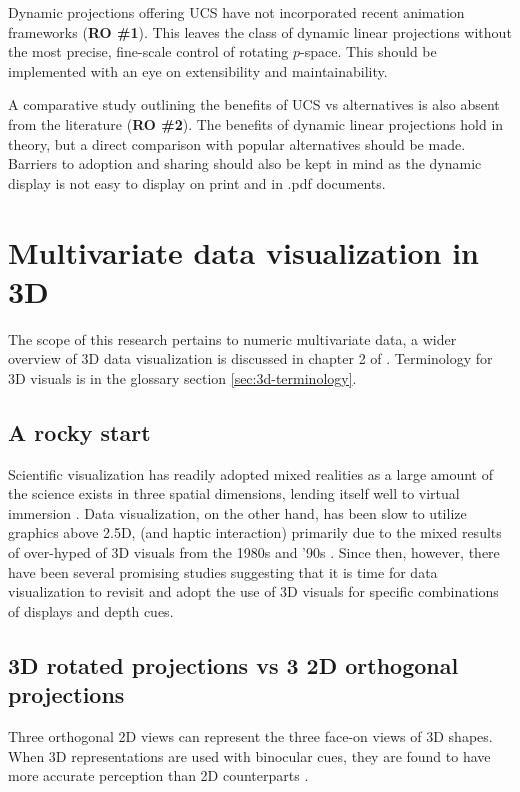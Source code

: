 \documentclass{monashthesis}
\begin{document}
Dynamic projections offering UCS have not incorporated recent animation
frameworks (\textbf{RO \#1}). This leaves the class of dynamic linear
projections without the most precise, fine-scale control of rotating
\(p\)-space. This should be implemented with an eye on extensibility and
maintainability.

A comparative study outlining the benefits of UCS vs alternatives is
also absent from the literature (\textbf{RO \#2}). The benefits of
dynamic linear projections hold in theory, but a direct comparison with
popular alternatives should be made. Barriers to adoption and sharing
should also be kept in mind as the dynamic display is not easy to
display on print and in .pdf documents.

\section{Multivariate data visualization in 3D}\label{sec:3d}

The scope of this research pertains to numeric multivariate data, a
wider overview of 3D data visualization is discussed in chapter 2 of
\textcite{marriott_immersive_2018}. Terminology for 3D visuals is in the
glossary section \ref{sec:3d-terminology}.

\subsection{A rocky start}\label{a-rocky-start}

Scientific visualization has readily adopted mixed realities as a large
amount of the science exists in three spatial dimensions, lending itself
well to virtual immersion \autocite{marriott_immersive_2018}. Data
visualization, on the other hand, has been slow to utilize graphics
above 2.5D, (and haptic interaction) primarily due to the mixed results
of over-hyped of 3D visuals from the 1980s and '90s
\autocite{munzner_visualization_2014}. Since then, however, there have
been several promising studies suggesting that it is time for data
visualization to revisit and adopt the use of 3D visuals for specific
combinations of displays and depth cues.

\subsection{3D rotated projections vs 3 2D orthogonal
projections}\label{d-rotated-projections-vs-3-2d-orthogonal-projections}

Three orthogonal 2D views can represent the three face-on views of 3D
shapes. When 3D representations are used with binocular cues, they are
found to have more accurate perception than 2D counterparts
\autocite{lee_effects_1986}.
\end{document}
